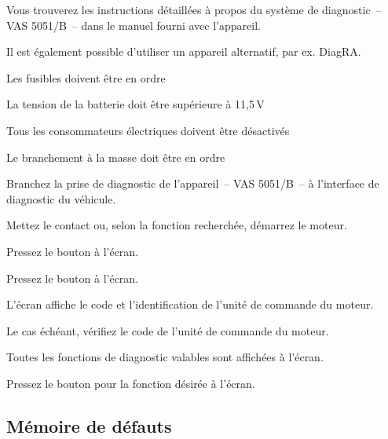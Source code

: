 \starttextbackground [FC]
\startPictPar
\PMgeneric
\PictPar
Vous trouverez les instructions détaillées à propos du système de
diagnostic~– VAS 5051/B~– dans le manuel fourni avec l’appareil.

Il est également possible d’utiliser un appareil alternatif, par ex. DiagRA.
\stopPictPar
\stoptextbackground

\page [yes]



\startitemize
\item Les fusibles doivent être en ordre
\item La tension de la batterie doit être supérieure à 11,5\,V
\item Tous les consommateurs électriques doivent être désactivés
\item Le branchement à la masse doit être en ordre
\stopitemize



\startSteps
\item Branchez la prise de diagnostic de l’appareil~– VAS 5051/B~– à l’interface de diagnostic du véhicule.
\item Mettez le contact ou, selon la fonction recherchée, démarrez le moteur.
\stopSteps


\startSteps [continue]
\item Pressez le bouton  à l’écran.
\stopSteps



\startSteps [continue]
\item Pressez le bouton  à l’écran.
\stopSteps

L’écran affiche le code et l’identification de l’unité de commande du moteur.

Le cas échéant, vérifiez le code de l’unité de commande du moteur.



Toutes les fonctions de diagnostic valables sont affichées à l’écran.

\startSteps [continue]
\item Pressez le bouton pour la fonction désirée à l’écran.
\stopSteps



\subsection [sSec:vw:faultMemory]{Mémoire de défauts}


